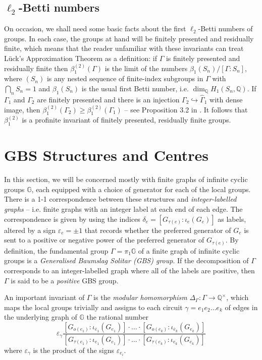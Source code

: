 \documentclass[11pt, a4 paper]{amsart}
\numberwithin{equation}{section}
\theoremstyle{remark}
\theoremstyle{definition}
\def\Q{\mathbb Q}
\def\G{\Gamma}
\def\e{\varepsilon}
\def\-{\overline}
\def\wh{\widehat}
\def\GG{\mathbb{G}}
\def\d{\delta}
\def\-{\overline}
\def\G{\Gamma}
\begin{document}
\subsection{$\ell_2$-Betti numbers}

On occasion, we shall need some basic facts 
about the first $\ell_2$-Betti numbers of groups. 
In each case, the groups at hand will be 
finitely presented and residually finite, 
which means that the reader unfamiliar with these invariants 
can treat L\"{u}ck's Approximation Theorem 
\cite{luck1994approximating} as a definition: 
if $\G$ is finitely presented and residually finite
then $\beta_1^{(2)}(\G)$ is the limit 
of the numbers $\beta_1(S_n)/[\G\colon S_n]$, 
where $(S_n)$ is any nested sequence 
of finite-index subgroups in $\G$ with $\bigcap_n S_n = 1$ 
and $\beta_1(S_n)$ is the usual first Betti number, 
i.e. $\dim_\Q H_1(S_n,\Q)$. 
If $\G_1$ and $\G_2$ are finitely presented and there is 
an injection $\G_2\hookrightarrow\wh{\G}_1$ with dense image, 
then $\beta_1^{(2)}(\G_2)\ge \beta_1^{(2)}(\G_1)$ 
-- see Proposition 3.2 in \cite{bridson2013determining}. 
It follows that $\beta_1^{(2)}$ is a profinite invariant 
of finitely presented, residually finite groups. 




\section{GBS Structures and Centres}
\label{sec:GBS}

In this section, we will be concerned mostly 
with finite graphs of infinite cyclic groups $\GG$, 
each equipped with a choice of generator 
for each of the local groups. 
There is a 1-1 correspondence between these structures 
and {\em integer-labelled graphs} -- i.e. 
finite graphs with an integer label at each end of each edge. 
The correspondence is given by using the indices 
$\d_e=[G_{\tau(e)} : \iota_e(G_e)]$ as labels, 
altered by a sign $\e_e=\pm 1$ 
that records whether the preferred generator of $G_e$ is sent to 
a positive or negative power 
of the preferred generator of $G_{\tau(e)}$. 
By definition, the fundamental group $\Gamma=\pi_1\GG$ 
of a finite graph of infinite cyclic groups 
is a {\em Generalised Baumslag Solitar (GBS) group}. 
If the decomposition of $\Gamma$ 
corresponds to an integer-labelled graph 
where all of the labels are positive, 
then $\Gamma$ is said to be a {\em positive} GBS group. 

An important invariant of $\Gamma$ is 
the {\em modular homomorphism} 
$\Delta_\Gamma : {\Gamma\to \mathbb{Q}^\times}$, 
which maps the local groups trivially 
and assigns to each circuit $\gamma= e_1e_2\ldots e_k$ of edges 
in the underlying graph of $\GG$ 
the rational number 
\begin{equation}
	\label{eq:fraction}
	\e_\gamma
	\frac{[G_{o(e_1)}: \iota_{\-{e}_1}(G_{e_1})] \cdot\ldots\cdot [G_{o(e_k)}: \iota_{\-{e}_k}(G_{e_k})]}%
	{[G_{\tau(e_1)}: \iota_{e_1} (G_{e_1})] \cdot\ldots\cdot [G_{\tau(e_k)}: \iota_{e_k}(G_{e_k})]}
\end{equation}
where $\e_\gamma$ is the product of the signs $\e_{e_i}$. 
\end{document}
